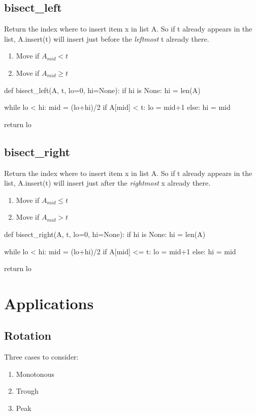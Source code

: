 \subsection{bisect\_left}
Return the index where to insert item x in list A. So if t already appears in the list,
A.insert(t) will insert just before the \textit{leftmost} t already there.
\begin{enumerate}
\item Move  if $A_{mid} < t$
\item Move  if $A_{mid} \geq t$
\end{enumerate}

\begin{python}
def bisect_left(A, t, lo=0, hi=None):
    if hi is None: hi = len(A)

    while lo < hi:
        mid = (lo+hi)/2
        if A[mid] < t: lo = mid+1   
        else:          hi = mid

    return lo
\end{python}

\subsection{bisect\_right}
Return the index where to insert item x in list A. So if t already appears in the list, A.insert(t) will insert just after the \textit{rightmost} x already there.
\begin{enumerate}
\item Move  if $A_{mid} \leq t$
\item Move  if $A_{mid} > t$
\end{enumerate}
\begin{python}
def bisect_right(A, t, lo=0, hi=None):
    if hi is None: hi = len(A)

    while lo < hi:
        mid = (lo+hi)/2
        if A[mid] <= t: lo = mid+1
        else:           hi = mid 

    return lo
\end{python}
\section{Applications}
\subsection{Rotation}
 Three cases to consider:
\begin{enumerate}
\item Monotonous 
\item Trough 
\item Peak
\end{enumerate}

